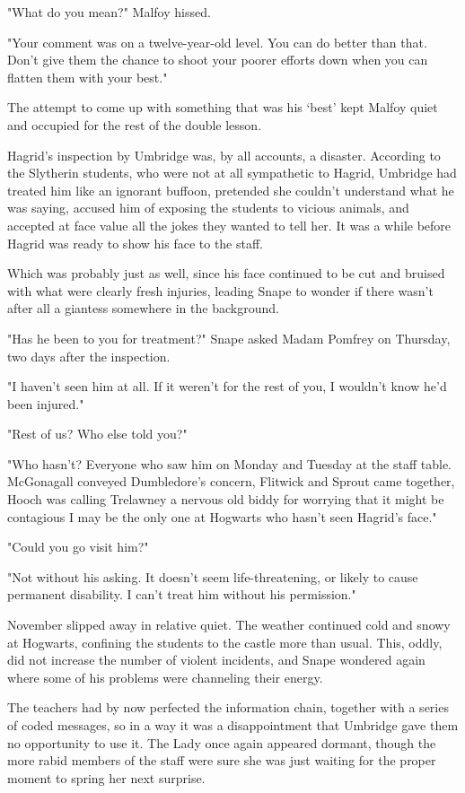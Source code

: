 "What do you mean?" Malfoy hissed.

"Your comment was on a twelve-year-old level. You can do better than that. Don't give them the chance to shoot your poorer efforts down when you can flatten them with your best."

The attempt to come up with something that was his `best' kept Malfoy quiet and occupied for the rest of the double lesson.

Hagrid's inspection by Umbridge was, by all accounts, a disaster. According to the Slytherin students, who were not at all sympathetic to Hagrid, Umbridge had treated him like an ignorant buffoon, pretended she couldn't understand what he was saying, accused him of exposing the students to vicious animals, and accepted at face value all the jokes they wanted to tell her. It was a while before Hagrid was ready to show his face to the staff.

Which was probably just as well, since his face continued to be cut and bruised with what were clearly fresh injuries, leading Snape to wonder if there wasn't after all a giantess somewhere in the background.

"Has he been to you for treatment?" Snape asked Madam Pomfrey on Thursday, two days after the inspection.

"I haven't seen him at all. If it weren't for the rest of you, I wouldn't know he'd been injured."

"Rest of us? Who else told you?"

"Who hasn't? Everyone who saw him on Monday and Tuesday at the staff table. McGonagall conveyed Dumbledore's concern, Flitwick and Sprout came together, Hooch was calling Trelawney a nervous old biddy for worrying that it might be contagious{\el} I may be the only one at Hogwarts who hasn't seen Hagrid's face."

"Could you go visit him?"

"Not without his asking. It doesn't seem life-threatening, or likely to cause permanent disability. I can't treat him without his permission."

\sbreak

November slipped away in relative quiet. The weather continued cold and snowy at Hogwarts, confining the students to the castle more than usual. This, oddly, did not increase the number of violent incidents, and Snape wondered again where some of his problems were channeling their energy.

The teachers had by now perfected the information chain, together with a series of coded messages, so in a way it was a disappointment that Umbridge gave them no opportunity to use it. The Lady once again appeared dormant, though the more rabid members of the staff were sure she was just waiting for the proper moment to spring her next surprise.


